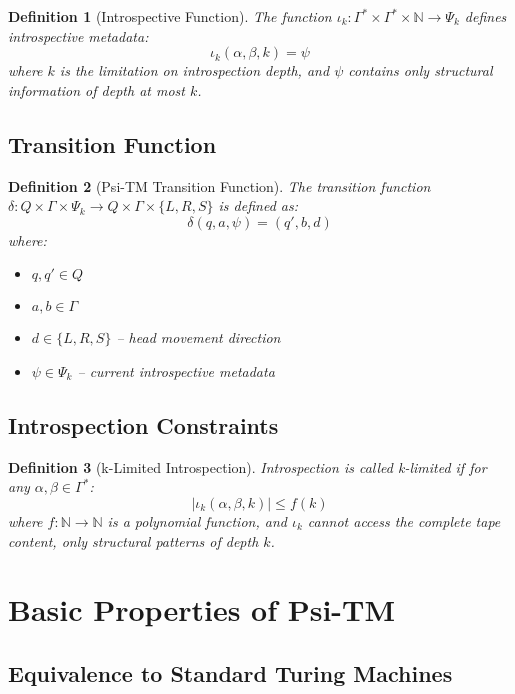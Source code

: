\documentclass[11pt]{article}
\newtheorem{definition}{Definition}
\begin{document}
\begin{definition}[Introspective Function]
The function $\iota_k: \Gamma^* \times \Gamma^* \times \mathbb{N} \to \Psi_k$ defines introspective metadata:
$$\iota_k(\alpha, \beta, k) = \psi$$
where $k$ is the limitation on introspection depth, and $\psi$ contains only structural information of depth at most $k$.
\end{definition}

\subsection{Transition Function}

\begin{definition}[Psi-TM Transition Function]
The transition function $\delta: Q \times \Gamma \times \Psi_k \to Q \times \Gamma \times \{L, R, S\}$ is defined as:
$$\delta(q, a, \psi) = (q', b, d)$$
where:
\begin{itemize}
\item $q, q' \in Q$
\item $a, b \in \Gamma$
\item $d \in \{L, R, S\}$ -- head movement direction
\item $\psi \in \Psi_k$ -- current introspective metadata
\end{itemize}
\end{definition}

\subsection{Introspection Constraints}

\begin{definition}[k-Limited Introspection]
Introspection is called k-limited if for any $\alpha, \beta \in \Gamma^*$:
$$|\iota_k(\alpha, \beta, k)| \leq f(k)$$
where $f: \mathbb{N} \to \mathbb{N}$ is a polynomial function, and $\iota_k$ cannot access the complete tape content, only structural patterns of depth $k$.
\end{definition}

\section{Basic Properties of Psi-TM}

\subsection{Equivalence to Standard Turing Machines}
\end{document}

